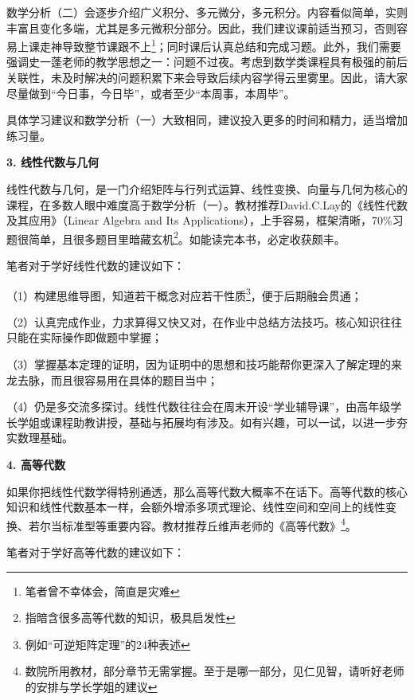 \documentclass[11pt,oneside]{book}
\begin{document}
数学分析（二）会逐步介绍广义积分、多元微分，多元积分。内容看似简单，实则丰富且变化多端，尤其是多元微积分部分。因此，我们建议课前适当预习，否则容易上课走神导致整节课跟不上\footnote{笔者曾不幸体会，简直是灾难}；同时课后认真总结和完成习题。此外，我们需要强调史一蓬老师的教学思想之一：问题不过夜。考虑到数学类课程具有极强的前后关联性，未及时解决的问题积累下来会导致后续内容学得云里雾里。因此，请大家尽量做到“今日事，今日毕”，或者至少“本周事，本周毕”。

具体学习建议和数学分析（一）大致相同，建议投入更多的时间和精力，适当增加练习量。

\vspace{20pt}

\textbf{3. 线性代数与几何} 

线性代数与几何，是一门介绍矩阵与行列式运算、线性变换、向量与几何为核心的课程，在多数人眼中难度高于数学分析（一）。教材推荐David.C.Lay的《线性代数及其应用》（Linear Algebra and Its Applications），上手容易，框架清晰，70\%习题很简单，且很多题目里暗藏玄机\footnote{指暗含很多高等代数的知识，极具启发性}。如能读完本书，必定收获颇丰。

\vspace{20pt}

笔者对于学好线性代数的建议如下：

（1）构建思维导图，知道若干概念对应若干性质\footnote{例如“可逆矩阵定理”的24种表述}，便于后期融会贯通；

（2）认真完成作业，力求算得又快又对，在作业中总结方法技巧。核心知识往往只能在实际操作即做题中掌握；

（3）掌握基本定理的证明，因为证明中的思想和技巧能帮你更深入了解定理的来龙去脉，而且很容易用在具体的题目当中；

（4）仍是多交流多探讨。线性代数往往会在周末开设“学业辅导课”，由高年级学长学姐或课程助教讲授，基础与拓展均有涉及。如有兴趣，可以一试，以进一步夯实数理基础。

\vspace{20pt}

\textbf{4. 高等代数}

如果你把线性代数学得特别通透，那么高等代数大概率不在话下。高等代数的核心知识和线性代数基本一样，会额外增添多项式理论、线性空间和空间上的线性变换、若尔当标准型等重要内容。教材推荐丘维声老师的《高等代数》\footnote{数院所用教材，部分章节无需掌握。至于是哪一部分，见仁见智，请听好老师的安排与学长学姐的建议}。

\vspace{20pt}

笔者对于学好高等代数的建议如下：
\end{document}
